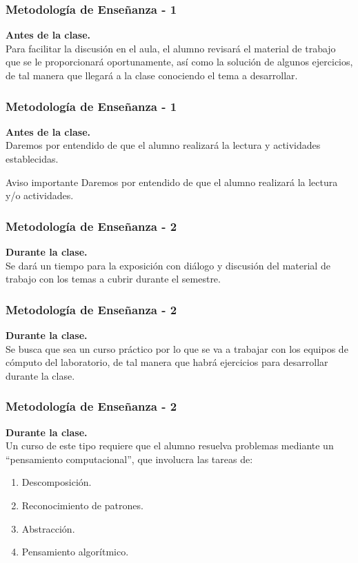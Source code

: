 \documentclass[12pt]{beamer}
\begin{document}
\begin{frame}
\frametitle{Metodología de Enseñanza - 1}
\textbf{Antes de la clase.}
\\
\vspace{0.5em}
Para facilitar la discusión en el aula, el alumno revisará el material de trabajo que se le proporcionará oportunamente, así como la solución de algunos ejercicios, de tal manera que llegará a la clase conociendo el tema a desarrollar.
\end{frame}
\begin{frame}
\frametitle{Metodología de Enseñanza - 1}
\textbf{Antes de la clase.}
\\
\vspace{0.5em}
Daremos por entendido de que el alumno realizará la lectura y actividades establecidas.
\\
\bigskip
\pause
\begin{alertblock}{Aviso importante}
Daremos por entendido de que el alumno realizará la lectura y/o actividades.
\end{alertblock}
\end{frame}
\begin{frame} 
\frametitle{Metodología de Enseñanza - 2}
\textbf{Durante la clase.}
\\
\vspace{0.5em}
Se dará un tiempo para la exposición con diálogo y discusión del material de trabajo con los temas a cubrir durante el semestre.
\end{frame}
\begin{frame} 
\frametitle{Metodología de Enseñanza - 2}
\textbf{Durante la clase.}
\\
\vspace{0.5em}
Se busca que sea un curso práctico por lo que se va a trabajar con los equipos de cómputo del laboratorio, de tal manera que habrá ejercicios para desarrollar durante la clase.
\end{frame}
\begin{frame} 
\frametitle{Metodología de Enseñanza - 2}
\textbf{Durante la clase.}
\\
\vspace{0.5em}
Un curso de este tipo requiere que el alumno resuelva problemas mediante un \enquote{pensamiento computacional}, que involucra las tareas de:
\pause
{}
\begin{enumerate}[<+->]
\item Descomposición.
\item Reconocimiento de patrones.
\item Abstracción.
\item Pensamiento algorítmico.
\end{enumerate}
\end{frame}
\end{document}
